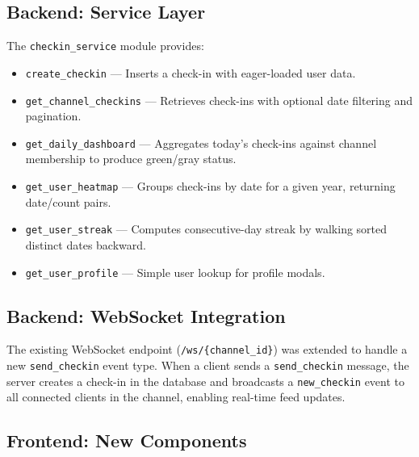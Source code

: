 \documentclass[11pt]{article}
\begin{document}
\subsection{Backend: Service Layer}

The \texttt{checkin\_service} module provides:

\begin{itemize}[leftmargin=1.5em]
    \item \texttt{create\_checkin} --- Inserts a check-in with eager-loaded user data.
    \item \texttt{get\_channel\_checkins} --- Retrieves check-ins with optional date filtering and pagination.
    \item \texttt{get\_daily\_dashboard} --- Aggregates today's check-ins against channel membership to produce green/gray status.
    \item \texttt{get\_user\_heatmap} --- Groups check-ins by date for a given year, returning date/count pairs.
    \item \texttt{get\_user\_streak} --- Computes consecutive-day streak by walking sorted distinct dates backward.
    \item \texttt{get\_user\_profile} --- Simple user lookup for profile modals.
\end{itemize}

\subsection{Backend: WebSocket Integration}

The existing WebSocket endpoint (\texttt{/ws/\{channel\_id\}}) was extended to handle a new \texttt{send\_checkin} event type. When a client sends a \texttt{send\_checkin} message, the server creates a check-in in the database and broadcasts a \texttt{new\_checkin} event to all connected clients in the channel, enabling real-time feed updates.

\subsection{Frontend: New Components}
\end{document}
